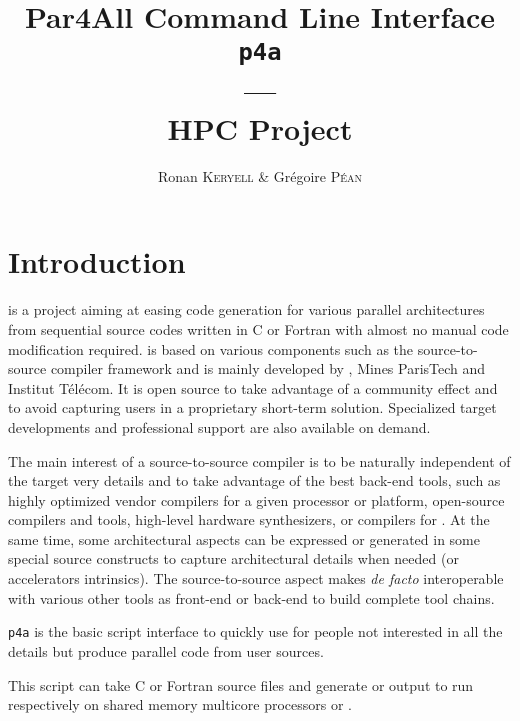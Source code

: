 \documentclass[a4paper]{article}
\begin{document}
\title{Par4All Command Line Interface\\
  \texttt{p4a}\\
  ---\\
  HPC Project}

\author{Ronan \textsc{Keryell} \& Grégoire \textsc{Péan}}

\maketitle

\tableofcontents{}



\section{Introduction}
\label{sec:introduction}

\Apfa is a project aiming at easing code generation for various parallel
architectures from sequential source codes written in C or Fortran with
almost no manual code modification required. \Apfa is based on various
components such as the \Apips source-to-source compiler framework and is
mainly developed by \Ahpcp, Mines ParisTech and Institut Télécom. It
is open source to take advantage of a community effect and to avoid
capturing users in a proprietary short-term solution. Specialized target
developments and professional support are also available on demand.

The main interest of a source-to-source compiler is to be naturally
independent of the target very details and to take advantage of the best
back-end tools, such as highly optimized vendor compilers for a given
processor or platform, open-source compilers and tools, high-level
hardware synthesizers, \Acuda or \Aopencl compilers for \Agpu. At the same
time, some architectural aspects can be expressed or generated in some
special source constructs to capture architectural details when needed
(\Asimd or accelerators intrinsics). The source-to-source aspect makes
\Apfa \emph{de facto} interoperable with various other tools as front-end
or back-end to build complete tool chains.

\texttt{p4a} is the basic script interface to quickly use \Apfa for people
not interested in all the \Apips details but produce parallel code from
user sources.

This script can take C or Fortran source files and generate \Aopenmp or
\Acuda output to run respectively on shared memory multicore processors or
\Agpu.
\end{document}
